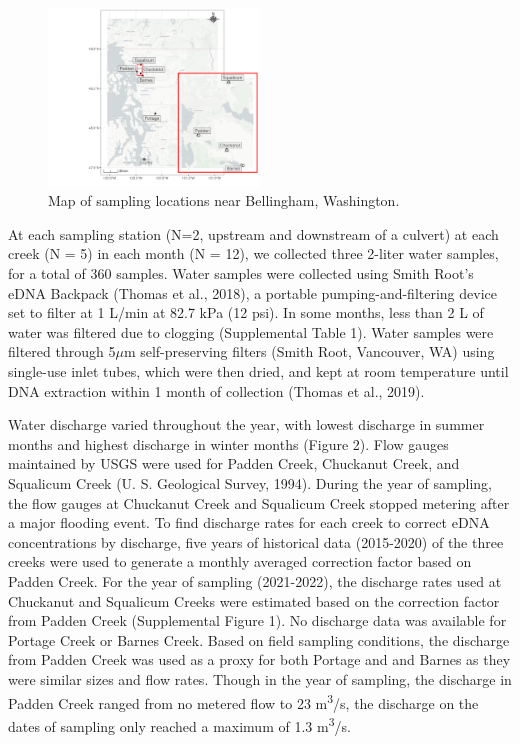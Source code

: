 \documentclass[
]{article}
\begin{document}
\begin{figure}
\centering
\includegraphics[width=0.5\textwidth,height=\textheight]{../Output/Figures/SiteMap.png}
\caption{Map of sampling locations near Bellingham,
Washington.\label{fig:map}}
\end{figure}

At each sampling station (N=2, upstream and downstream of a culvert) at
each creek (N = 5) in each month (N = 12), we collected three 2-liter
water samples, for a total of 360 samples. Water samples were collected
using Smith Root's eDNA Backpack (Thomas et al., 2018), a portable
pumping-and-filtering device set to filter at 1 L/min at 82.7 kPa (12
psi). In some months, less than 2 L of water was filtered due to
clogging (Supplemental Table 1). Water samples were filtered through
5\(\mu\)m self-preserving filters (Smith Root, Vancouver, WA) using
single-use inlet tubes, which were then dried, and kept at room
temperature until DNA extraction within 1 month of collection (Thomas et
al., 2019).

Water discharge varied throughout the year, with lowest discharge in
summer months and highest discharge in winter months (Figure 2). Flow
gauges maintained by USGS were used for Padden Creek, Chuckanut Creek,
and Squalicum Creek (U. S. Geological Survey, 1994). During the year of
sampling, the flow gauges at Chuckanut Creek and Squalicum Creek stopped
metering after a major flooding event. To find discharge rates for each
creek to correct eDNA concentrations by discharge, five years of
historical data (2015-2020) of the three creeks were used to generate a
monthly averaged correction factor based on Padden Creek. For the year
of sampling (2021-2022), the discharge rates used at Chuckanut and
Squalicum Creeks were estimated based on the correction factor from
Padden Creek (Supplemental Figure 1). No discharge data was available
for Portage Creek or Barnes Creek. Based on field sampling conditions,
the discharge from Padden Creek was used as a proxy for both Portage and
and Barnes as they were similar sizes and flow rates. Though in the year
of sampling, the discharge in Padden Creek ranged from no metered flow
to 23 m\textsuperscript{3}/s, the discharge on the dates of sampling
only reached a maximum of 1.3 m\textsuperscript{3}/s.
\end{document}
